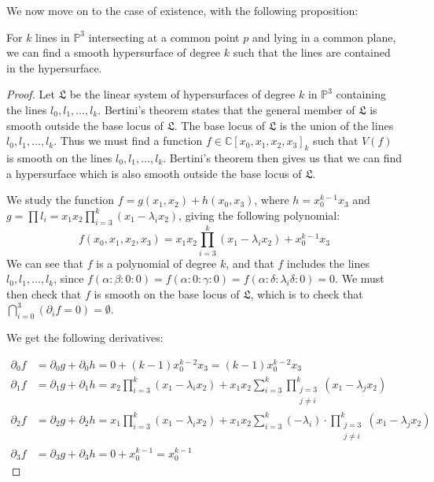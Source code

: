 We now move on to the case of existence, with the following proposition:

\begin{proposition}
    For $k$ lines in $\mathbb{P}^3$ intersecting at a common point $p$ and lying in a common plane, we can find a smooth hypersurface of degree $k$ such that the lines are contained in the hypersurface.
\end{proposition}
\begin{proof}
    Let $\mathfrak{L}$ be the linear system of hypersurfaces of degree $k$ in $\mathbb{P}^3$ containing the lines $l_0, l_1, \dots, l_k$. 
    Bertini's theorem states that the general member of $\mathfrak{L}$ is smooth outside the base locus of $\mathfrak{L}$.
    The base locus of $\mathfrak{L}$ is the union of the lines $l_0, l_1, \dots, l_k$.
    Thus we must find a function $f \in \mathbb{C}[x_0, x_1, x_2, x_3]_k$ such that $V(f)$ is smooth on the lines $l_0, l_1, \dots, l_k$.
    Bertini's theorem then gives us that we can find a hypersurface which is also smooth outside the base locus of $\mathfrak{L}$.

    We study the function $f = g(x_1, x_2) + h(x_0, x_3)$, where $h = x_0^{k-1}x_3$ and $g = \prod l_i = x_1x_2 \prod_{i=3}^k (x_1 - \lambda_i x_2)$, giving the following polynomial:
    \[
        f(x_0, x_1, x_2, x_3) = x_1x_2 \prod_{i=3}^k (x_1 - \lambda_i x_2) + x_0^{k-1}x_3
    \]
    We can see that $f$ is a polynomial of degree $k$, and that $f$ includes the lines $l_0, l_1, \dots, l_k$, since $f(\alpha: \beta: 0: 0) = f(\alpha: 0: \gamma: 0) = f(\alpha: \delta: \lambda_i \delta: 0) = 0$.
    We must then check that $f$ is smooth on the base locus of $\mathfrak{L}$, which is to check that $\bigcap_{i=0}^3 (\partial_i f = 0) = \emptyset$.
    
    We get the following derivatives:

    \begin{align*}
        \partial_0 f &= \partial_0 g + \partial_0 h = 0 + (k-1)x_0^{k-2}x_3 = (k-1)x_0^{k-2}x_3 \\
        \partial_1 f &= \partial_1 g + \partial_1 h = x_2 \prod_{i=3}^k (x_1 - \lambda_i x_2) + x_1x_2 \sum_{i=3}^k \prod_{\substack{j=3 \\ j \neq i}}^k (x_1 - \lambda_j x_2)\\
        \partial_2 f &= \partial_2 g + \partial_2 h = x_1 \prod_{i=3}^k (x_1 - \lambda_i x_2) +  x_1x_2 \sum_{i=3}^k (-\lambda_i) \cdot \prod_{\substack{j=3 \\ j \neq i}}^k (x_1 - \lambda_j x_2)\\
        \partial_3 f &= \partial_3 g + \partial_3 h = 0 + x_0^{k-1} = x_0^{k-1}
    \end{align*}


\end{proof}
